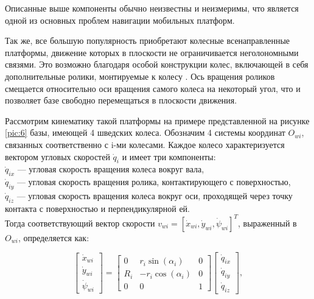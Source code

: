 \documentclass[14pt, a4paper]{extreport}
\begin{document}
Описанные выше компоненты обычно неизвестны и неизмеримы, что является одной из основных проблем навигации мобильных платформ.
\newpage

Так же, все большую популярность приобретают колесные всенаправленные платформы, движение которых в плоскости не ограничивается неголономными связями. Это возможно благодаря особой конструкции колес, включающей в себя дополнительные ролики, монтируемые к колесу \cite{Muir}. Ось вращения роликов смещается относительно оси вращения самого колеса на некоторый угол, что и позволяет базе свободно перемещаться в плоскости движения.

Рассмотрим кинематику такой платформы на примере представленной на рисунке \ref{pic:6} базы, имеющей 4 шведских колеса. Обозначим 4 системы координат $O_{wi}$, связанных соответственно с i-ми колесами. Каждое колесо характеризуется вектором угловых скоростей $\dot{q}_i$ и имеет три компоненты:\\[3mm]
$\dot{q}_{ix}$ --- угловая скорость вращения колеса вокруг вала,\\[3mm]
$\dot{q}_{iy}$ --- угловая скорость вращения ролика, контактирующего с поверхностью,\\[3mm]
$\dot{q}_{iz}$ --- угловая скорость вращения колеса вокруг оси, проходящей через точку контакта с поверхностью и перпендикулярной ей.\\[3mm]

Тогда соответствующий вектор скорости $v_{wi} = [\dot{x}_{wi}, \dot{y}_{wi}, \dot{\psi}_{wi}]^T$, выраженный в $O_{wi}$, определяется как:

\begin{equation}
\begin{bmatrix}
\dot{x}_{wi}\\[1mm] \dot{y}_{wi}\\[1mm] \dot{\psi}_{wi}
\end{bmatrix} = 
\begin{bmatrix}
0 & r_i\sin(\alpha_i) & 0\\[1mm]
R_i & -r_i\cos(\alpha_i) & 0\\[1mm]
0 & 0 & 1
\end{bmatrix}
\begin{bmatrix}
\dot{q}_{ix}\\[1mm] \dot{q}_{iy}\\[1mm] \dot{q}_{iz}
\end{bmatrix}\!,
\tag{35} \label{eq:35}
\end{equation}
\ \\
\end{document}
